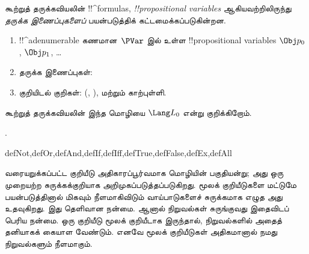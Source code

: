 \documentclass[../../../include/open-logic-section]{subfiles}
\begin{document}


கூற்றுத் தருக்கவியலின் !!^{formula}s,
\emph{!!{propositional
    variable}s}
 ஆகியவற்றிலிருந்து
\emph{தருக்க இணைப்புகளைப்} பயன்படுத்திக் கட்டமைக்கப்படுகின்றன.

\begin{enumerate}
\item !!^a{denumerable} கணமான~$\PVar$ இல் உள்ள !!{propositional variable}s
  $\Obj p_0$, $\Obj p_1$, \dots
{}
\item தருக்க இணைப்புகள்:
  \startycommalist
\item குறியிடல் குறிகள்: (, ), மற்றும் காற்புள்ளி.
\end{enumerate}

கூற்றுத் தருக்கவியலின் இந்த மொழியை $\Lang L_0$ என்று குறிக்கிறோம்.

.

\begin{tagblock}{defNot,defOr,defAnd,defIf,defIff,defTrue,defFalse,defEx,defAll}
\begin{explain}
வரையறுக்கப்பட்ட குறியீடு அதிகாரப்பூர்வமாக மொழியின் பகுதியன்று; அது ஒரு
முறையற்ற சுருக்கக்குறியாக அறிமுகப்படுத்தப்படுகிறது. மூலக் குறியீடுகளை
மட்டுமே பயன்படுத்தினால் மிகவும் நீளமாகிவிடும் வாய்பாடுகளைச் சுருக்கமாக
எழுத அது உதவுகிறது. இது தெளிவான நன்மை. ஆனால் நிறுவல்கள் சுருங்குவது
இதைவிடப் பெரிய நன்மை. ஒரு குறியீடு மூலக் குறியீடாக இருந்தால், நிறுவல்களில்
அதைத் தனியாகக் கையாள வேண்டும். எனவே மூலக் குறியீடுகள் அதிகமானால் நமது
நிறுவல்களும் நீளமாகும்.
\end{explain}
\end{tagblock}
\end{document}
